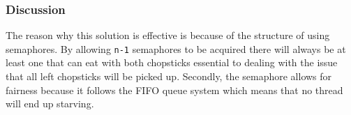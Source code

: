 \documentclass{article}
\begin{document}
\subsubsection{Discussion}
The reason why this solution is effective is because of the structure of using semaphores. By allowing \texttt{n-1} semaphores to be acquired there will always be at least one that can eat with both chopsticks essential to dealing with the issue that all left chopsticks will be picked up. Secondly, the semaphore allows for fairness because it follows the FIFO queue system which means that no thread will end up starving.


\newpage
\printbibliography
\end{document}
